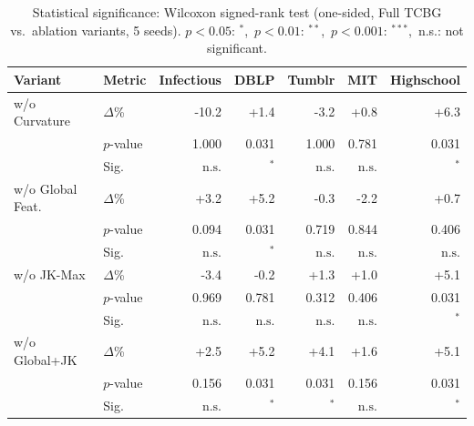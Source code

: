 \begin{table}[t]
\centering
\caption{Statistical significance: Wilcoxon signed-rank test (one-sided, Full TCBG vs.\ ablation variants, 5 seeds). $p{<}0.05$: $^*$,\ $p{<}0.01$: $^{**}$,\ $p{<}0.001$: $^{***}$,\ n.s.: not significant.}
\label{tab:significance}
\small
\setlength{\tabcolsep}{4pt}
\begin{tabular}{llrrrrr}
\toprule
\textbf{Variant} & \textbf{Metric} & \textbf{Infectious} & \textbf{DBLP} & \textbf{Tumblr} & \textbf{MIT} & \textbf{Highschool} \\
\midrule
w/o Curvature & $\Delta$\% & -10.2 & +1.4 & -3.2 & +0.8 & +6.3 \\
 & $p$-value & 1.000 & 0.031 & 1.000 & 0.781 & 0.031 \\
 & Sig. & $\text{n.s.}$ & $^{*}$ & $\text{n.s.}$ & $\text{n.s.}$ & $^{*}$ \\
\midrule
w/o Global Feat. & $\Delta$\% & +3.2 & +5.2 & -0.3 & -2.2 & +0.7 \\
 & $p$-value & 0.094 & 0.031 & 0.719 & 0.844 & 0.406 \\
 & Sig. & $\text{n.s.}$ & $^{*}$ & $\text{n.s.}$ & $\text{n.s.}$ & $\text{n.s.}$ \\
\midrule
w/o JK-Max & $\Delta$\% & -3.4 & -0.2 & +1.3 & +1.0 & +5.1 \\
 & $p$-value & 0.969 & 0.781 & 0.312 & 0.406 & 0.031 \\
 & Sig. & $\text{n.s.}$ & $\text{n.s.}$ & $\text{n.s.}$ & $\text{n.s.}$ & $^{*}$ \\
\midrule
w/o Global+JK & $\Delta$\% & +2.5 & +5.2 & +4.1 & +1.6 & +5.1 \\
 & $p$-value & 0.156 & 0.031 & 0.031 & 0.156 & 0.031 \\
 & Sig. & $\text{n.s.}$ & $^{*}$ & $^{*}$ & $\text{n.s.}$ & $^{*}$ \\
\bottomrule
\end{tabular}
\end{table}